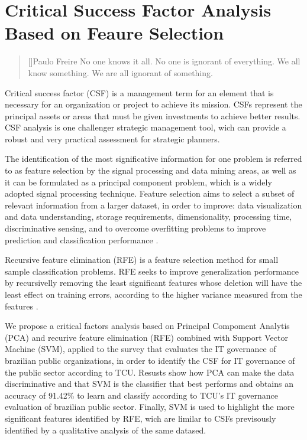 \chapter{Critical Success Factor Analysis Based on Feaure Selection}
\label{ch:2_csf_fs}

\begin{quotation}[]{Paulo Freire}
No one knows it all. No one is ignorant of everything. We all know something. We are all ignorant of something.
\end{quotation}

Critical success factor (CSF) is a management term for an element that is necessary for an organization or project to achieve its mission. CSFs represent the principal assets or areas that must be given investments to achieve better results. CSF analysis is one challenger strategic management tool, wich can provide a robust and very practical assessment for strategic planners.

The identification of the most significative information for one problem is referred to as feature selection by the signal processing and data mining areas, as well as it can be formulated as a principal component problem, which is a widely adopted signal processing technique. Feature selection aims to select a subset of relevant information from a larger dataset, in order to improve: data visualization and data understanding, storage requirements, dimensionality, processing time, discriminative sensing, and to overcome overfitting problems to improve prediction and classification performance \cite{chandrashekar2014survey}.

Recursive feature elimination (RFE) is a feature selection method for small sample classification problems. RFE seeks to improve generalization performance by recursivelly removing the least significant features whose deletion will have the least effect on training errors, according to the higher variance measured from the features \cite{chen2007enhanced}.

We propose a critical factors analysis based on Principal Compoment Analytis (PCA) and recurive feature elimination (RFE) combined with Support Vector Machine (SVM), applied to the survey that evaluates the IT governance of brazilian public organizations, in order to identify the CSF for IT governance of the public sector according to TCU. Resusts show how PCA can make the data discriminative and that SVM is the classifier that best performs and obtains an accuracy of 91.42\% to learn and classify according to TCU's IT governance evaluation of brazilian public sector. Finally, SVM is used to highlight the more significant features identified by RFE, wich are limilar to CSFs previsously identified by a qualitative analysis of the same datased.

